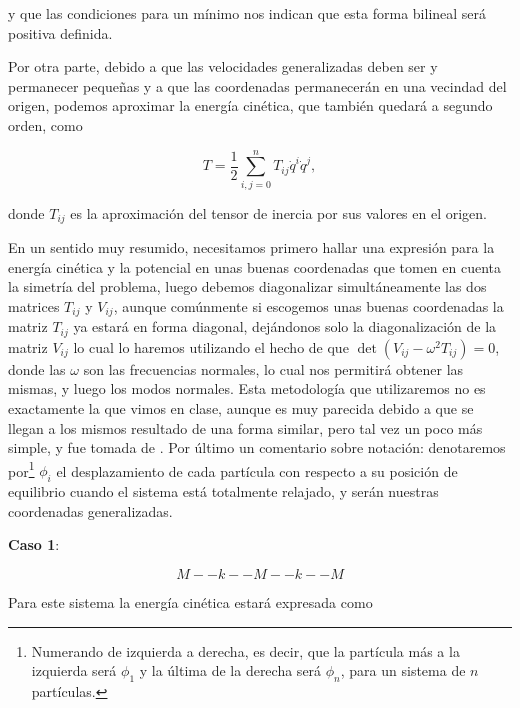 \documentclass[a4paper,10pt]{article}
\numberwithin{equation}{section}
\begin{document}
y que las condiciones para un mínimo nos indican que esta forma bilineal será 
positiva definida.

\vspace{.3cm}

Por otra parte, debido a que las velocidades generalizadas deben ser y permanecer 
pequeñas y a que las coordenadas permanecerán en una vecindad del origen, podemos 
aproximar la energía cinética, que también quedará a segundo orden, como 

\begin{equation}
 T = \frac{1}{2}\sum_{i,j=0}^n T_{ij}\dot{q}^i\dot{q}^j,
\end{equation}

donde $T_{ij}$ es la aproximación del tensor de inercia por sus valores en el origen.

\vspace{.3cm}

En un sentido muy resumido, necesitamos primero hallar una expresión para la energía 
cinética y la potencial en unas buenas coordenadas que tomen en cuenta la simetría 
del problema, luego debemos diagonalizar simultáneamente las dos matrices $T_{ij}$ 
y $V_{ij}$, aunque comúnmente si escogemos unas buenas coordenadas la matriz $T_{ij}$
ya estará en forma diagonal, dejándonos solo la diagonalización de la matriz $V_{ij}$
lo cual lo haremos utilizando el hecho de que $\det{(V_{ij}-\omega^2T_{ij})} = 0$, donde 
las $\omega$ son las frecuencias normales, lo cual nos permitirá obtener las mismas, 
y luego los modos normales. Esta metodología que utilizaremos no es exactamente la 
que vimos en clase, aunque es muy parecida debido a que se llegan a los mismos 
resultado de una forma similar, pero tal vez un poco más simple, y fue tomada de \cite{marion}. Por último un comentario sobre notación: 
denotaremos por\footnote{Numerando de izquierda a derecha,
es decir, que la partícula más a la izquierda será $\phi_1$ y la última de la 
derecha será $\phi_n$, para un sistema de $n$ partículas.} $\phi_i$ el desplazamiento de cada 
partícula con respecto a su posición de equilibrio cuando el sistema está totalmente 
relajado, y serán nuestras coordenadas generalizadas. 

\vspace{.3cm}

\textbf{Caso 1}:

$$
M - - k - - M - - k - - M
$$

\vspace{.3cm}

Para este sistema la energía cinética estará expresada como 
\end{document}
